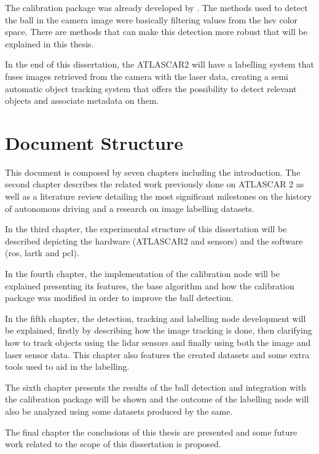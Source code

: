 The calibration package was already developed by \cite{VieiradaSilva2016}. The methods used to detect the ball in the camera image were basically filtering values from the \gls{hsv} color space. There are methods that can make this detection more robust that will be explained in this thesis. 

In the end of this dissertation, the ATLASCAR2 will have a labelling system that fuses images retrieved from the camera with the laser data, creating a semi automatic object tracking system that offers the possibility to detect relevant objects and associate metadata on them.


\section{Document Structure}

This document is composed by seven chapters including the introduction. The second chapter describes the related work previously done on ATLASCAR 2 as well as a literature review detailing the most significant milestones on the history of autonomous driving and a research on image labelling datasets. 

In the third chapter, the experimental structure of this dissertation will be described depicting the hardware (ATLASCAR2 and sensors) and the software (\gls{ros}, \gls{lartk} and \gls{pcl}). 

In the fourth chapter, the implementation of the calibration node will be explained presenting its features, the base algorithm and how the calibration package was modified in order to improve the ball detection. 

In the fifth chapter, the detection, tracking and labelling node development will be explained, firstly by describing how the image tracking is done, then clarifying how to track objects using the \gls{lidar} sensors and finally using both the image and laser sensor data. This chapter also features the created datasets and some extra tools used to aid in the labelling. 

The sixth chapter presents the results of the ball detection and integration with the calibration package will be shown and the outcome of the labelling node will also be analyzed using some datasets produced by the same. 

The final chapter the conclusions of this thesis are presented and some future work related to the scope of this dissertation is proposed.

